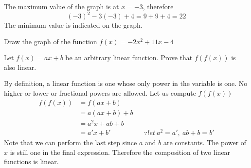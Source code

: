 \documentclass[a4paper]{article}
\begin{document}
The maximum value of the graph is at \(x=-3\), therefore
\[
(-3)^2 -3(-3) +4 = 9 + 9 + 4 = 22
\]
The minimum value is indicated on the graph.

\begin{question}
Draw the graph of the function \(f(x) = -2x^2 + 11x - 4\)
\end{question}

\begin{center}
\end{center}


\begin{question}
Let \(f(x) = ax+b\) be an arbitrary linear function. Prove that \(f(f(x))\) is also linear.
\end{question}
By definition, a linear function is one whose only power in the variable is one. No higher or lower or fractional powers are allowed. Let us compute \(f(f(x))\)
\begin{align*}
f(f(x)) &= f(ax+b) \\
    &=a(ax+b) + b\\
    &=a^2x + ab + b \\
    &=a'x + b' &&\because let\ a^2 = a', \ ab+b =b'
\end{align*}
Note that we can perform the last step since \(a\) and \(b\) are constants.
The power of \(x\) is still one in the final expression. Therefore the composition of two linear functions is linear.
\end{document}
